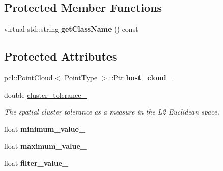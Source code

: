 \subsection*{Protected Member Functions}
\begin{DoxyCompactItemize}
\item 
\mbox{\label{classpcl__gpu_1_1PCLFilterPassThrough_abaf1d6c4821486b347c8dbb1f5cd8434}} 
virtual std\+::string {\bfseries get\+Class\+Name} () const
\end{DoxyCompactItemize}
\subsection*{Protected Attributes}
\begin{DoxyCompactItemize}
\item 
\mbox{\label{classpcl__gpu_1_1PCLFilterPassThrough_a2f90db771d04af15c8170d7aff94417b}} 
pcl\+::\+Point\+Cloud$<$ Point\+Type $>$\+::Ptr {\bfseries host\+\_\+cloud\+\_\+}
\item 
\mbox{\label{classpcl__gpu_1_1PCLFilterPassThrough_af6ed0359045468f21d4c6f500f6943eb}} 
double \hyperlink{classpcl__gpu_1_1PCLFilterPassThrough_af6ed0359045468f21d4c6f500f6943eb}{cluster\+\_\+tolerance\+\_\+}
\begin{DoxyCompactList}\small\item\em The spatial cluster tolerance as a measure in the L2 Euclidean space. \end{DoxyCompactList}\item 
\mbox{\label{classpcl__gpu_1_1PCLFilterPassThrough_afcd0fdfee49325bc65fbbba5290ff496}} 
float {\bfseries minimum\+\_\+value\+\_\+}
\item 
\mbox{\label{classpcl__gpu_1_1PCLFilterPassThrough_a5c5838f5158a4d7fe6fa6e8d593fd9f9}} 
float {\bfseries maximum\+\_\+value\+\_\+}
\item 
\mbox{\label{classpcl__gpu_1_1PCLFilterPassThrough_a48a6696cde74a615e9f8b66c00607936}} 
float {\bfseries filter\+\_\+value\+\_\+}
\end{DoxyCompactItemize}


